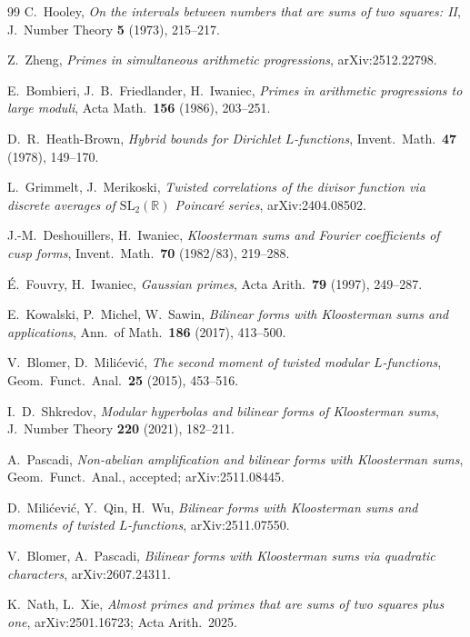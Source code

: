 \documentclass[11pt]{article}
\theoremstyle{plain}
\theoremstyle{definition}
\theoremstyle{remark}
\renewcommand{\_}{\textunderscore\allowbreak}
\begin{document}
\begin{thebibliography}{99}
 C.~Hooley, \emph{On the intervals between numbers that are sums of two
squares: II}, J.\ Number Theory \textbf{5} (1973), 215--217.

 Z.~Zheng, \emph{Primes in simultaneous arithmetic progressions},
arXiv:2512.22798.

 E.~Bombieri, J.~B.~Friedlander, H.~Iwaniec, \emph{Primes
in arithmetic progressions to large moduli}, Acta Math.\ \textbf{156} (1986), 203--251.

 D.~R.~Heath-Brown, \emph{Hybrid bounds for Dirichlet $L$-functions},
Invent.\ Math.\ \textbf{47} (1978), 149--170.

 L.~Grimmelt, J.~Merikoski, \emph{Twisted correlations of the
divisor function via discrete averages of $\mathrm{SL}_2(\mathbb R)$ Poincar\'e series},
arXiv:2404.08502.

 J.-M.~Deshouillers, H.~Iwaniec, \emph{Kloosterman sums and
Fourier coefficients of cusp forms}, Invent.\ Math.\ \textbf{70} (1982/83), 219--288.

 \'E.~Fouvry, H.~Iwaniec, \emph{Gaussian primes}, Acta Arith.\
\textbf{79} (1997), 249--287.

 E.~Kowalski, P.~Michel, W.~Sawin, \emph{Bilinear forms with
Kloosterman sums and applications}, Ann.\ of Math.\ \textbf{186} (2017), 413--500.

 V.~Blomer, D.~Mili\'cevi\'c, \emph{The second moment of twisted
modular $L$-functions}, Geom.\ Funct.\ Anal.\ \textbf{25} (2015), 453--516.

 I.~D.~Shkredov, \emph{Modular hyperbolas and bilinear forms of Kloosterman
sums}, J.\ Number Theory \textbf{220} (2021), 182--211.

 A.~Pascadi, \emph{Non-abelian amplification and bilinear forms with
Kloosterman sums}, Geom.\ Funct.\ Anal., accepted; arXiv:2511.08445.

 D.~Mili\'cevi\'c, Y.~Qin, H.~Wu, \emph{Bilinear forms with Kloosterman sums and
moments of twisted $L$-functions}, arXiv:2511.07550.

 V.~Blomer, A.~Pascadi, \emph{Bilinear forms with Kloosterman sums via
quadratic characters}, arXiv:2607.24311.

 K.~Nath, L.~Xie, \emph{Almost primes and primes that are sums of two
squares plus one}, arXiv:2501.16723; Acta Arith.\ 2025.


\end{thebibliography}
\end{document}
